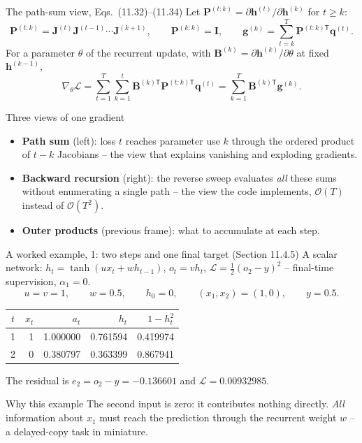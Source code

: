 \documentclass[10pt,aspectratio=169]{beamer}
\begin{document}
\begin{frame}{The path-sum view, Eqs.~(11.32)--(11.34)}
Let $\bm{P}^{(t:k)}=\partial\bm{h}^{(t)}/\partial\bm{h}^{(k)}$ for $t\ge k$:
\[
  \bm{P}^{(t:k)}=\bm{J}^{(t)}\bm{J}^{(t-1)}\cdots\bm{J}^{(k+1)},\qquad
  \bm{P}^{(k:k)}=\bm{I},\qquad
  \bm{g}^{(k)}=\sum_{t=k}^{T}\bm{P}^{(t:k)\mathsf{T}}\bm{q}^{(t)} .
\]
For a parameter $\theta$ of the recurrent update, with
$\bm{B}^{(k)}=\partial\bm{h}^{(k)}/\partial\theta$ at fixed $\bm{h}^{(k-1)}$,
\[
  \boxed{\;\nabla_\theta\mathcal{L}
  =\sum_{t=1}^{T}\sum_{k=1}^{t}\bm{B}^{(k)\mathsf{T}}\bm{P}^{(t:k)\mathsf{T}}\bm{q}^{(t)}
  =\sum_{k=1}^{T}\bm{B}^{(k)\mathsf{T}}\bm{g}^{(k)} .\;}
\]
\begin{block}{Three views of one gradient}
\begin{itemize}
  \item \textbf{Path sum} (left): loss $t$ reaches parameter use $k$ through
        the ordered product of $t-k$ Jacobians -- the view that explains
        vanishing and exploding gradients.
  \item \textbf{Backward recursion} (right): the reverse sweep evaluates
        \emph{all} these sums without enumerating a single path -- the view
        the code implements, $\mathcal{O}(T)$ instead of $\mathcal{O}(T^2)$.
  \item \textbf{Outer products} (previous frame): what to accumulate at each
        step.
\end{itemize}
\end{block}
\end{frame}

\begin{frame}{A worked example, 1: two steps and one final target (Section 11.4.5)}
A scalar network: $h_t=\tanh(ux_t+wh_{t-1})$, $o_t=vh_t$,
$\mathcal{L}=\tfrac12(o_2-y)^2$ -- final-time supervision, $\alpha_1=0$.
\[
  u=v=1,\qquad w=0.5,\qquad h_0=0,\qquad (x_1,x_2)=(1,0),\qquad y=0.5 .
\]
\begin{center}
\begin{tabular}{crrrr}\toprule
$t$ & $x_t$ & $a_t$ & $h_t$ & $1-h_t^2$\\\midrule
1 & 1 & 1.000000 & 0.761594 & 0.419974\\
2 & 0 & 0.380797 & 0.363399 & 0.867941\\\bottomrule
\end{tabular}
\end{center}
The residual is $e_2=o_2-y=-0.136601$ and $\mathcal{L}=0.00932985$.
\begin{block}{Why this example}
The second input is zero: it contributes nothing directly.  \emph{All}
information about $x_1$ must reach the prediction through the recurrent
weight $w$ -- a delayed-copy task in miniature.
\end{block}
\end{frame}
\end{document}
